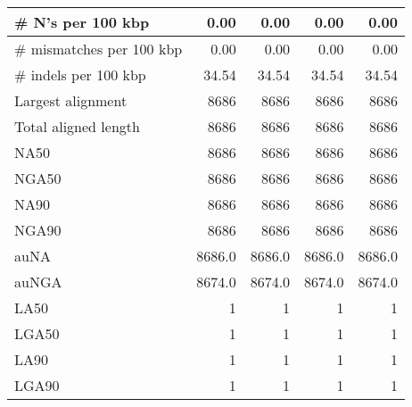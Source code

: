 \documentclass[12pt,a4paper]{article}
\begin{document}
\begin{table}[ht]
\begin{center}
\begin{tabular}{|l*{4}{|r}|}
\# N's per 100 kbp & 0.00 & 0.00 & 0.00 & 0.00 \\ \hline
\# mismatches per 100 kbp & 0.00 & 0.00 & 0.00 & 0.00 \\ \hline
\# indels per 100 kbp & 34.54 & 34.54 & 34.54 & 34.54 \\ \hline
Largest alignment & 8686 & 8686 & 8686 & 8686 \\ \hline
Total aligned length & 8686 & 8686 & 8686 & 8686 \\ \hline
NA50 & 8686 & 8686 & 8686 & 8686 \\ \hline
NGA50 & 8686 & 8686 & 8686 & 8686 \\ \hline
NA90 & 8686 & 8686 & 8686 & 8686 \\ \hline
NGA90 & 8686 & 8686 & 8686 & 8686 \\ \hline
auNA & 8686.0 & 8686.0 & 8686.0 & 8686.0 \\ \hline
auNGA & 8674.0 & 8674.0 & 8674.0 & 8674.0 \\ \hline
LA50 & 1 & 1 & 1 & 1 \\ \hline
LGA50 & 1 & 1 & 1 & 1 \\ \hline
LA90 & 1 & 1 & 1 & 1 \\ \hline
LGA90 & 1 & 1 & 1 & 1 \\ \hline
\end{tabular}
\end{center}
\end{table}
\end{document}
